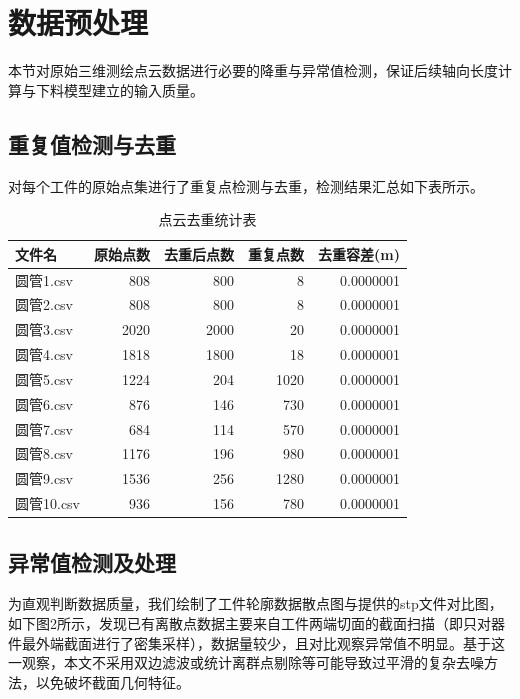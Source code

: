 \documentclass[UTF8]{ctexart}
\begin{document}
\section{数据预处理}
本节对原始三维测绘点云数据进行必要的降重与异常值检测，保证后续轴向长度计算与下料模型建立的输入质量。

\subsection{重复值检测与去重}

对每个工件的原始点集进行了重复点检测与去重，检测结果汇总如下表所示。
\begin{table}[htbp]
\centering
\caption{点云去重统计表}
\label{tab:dedup}
\begin{tabular}{l r r r r}
\toprule
文件名 & 原始点数 & 去重后点数 & 重复点数 & 去重容差(m) \\
\midrule
圆管1.csv  & 808  & 800  & 8    & 0.0000001 \\
圆管2.csv  & 808  & 800  & 8    & 0.0000001 \\
圆管3.csv  & 2020 & 2000 & 20   & 0.0000001 \\
圆管4.csv  & 1818 & 1800 & 18   & 0.0000001 \\
圆管5.csv  & 1224 & 204  & 1020 & 0.0000001 \\
圆管6.csv  & 876  & 146  & 730  & 0.0000001 \\
圆管7.csv  & 684  & 114  & 570  & 0.0000001 \\
圆管8.csv  & 1176 & 196  & 980  & 0.0000001 \\
圆管9.csv  & 1536 & 256  & 1280 & 0.0000001 \\
圆管10.csv & 936  & 156  & 780  & 0.0000001 \\
\bottomrule
\end{tabular}
\end{table}

\subsection{异常值检测及处理}

为直观判断数据质量，我们绘制了工件轮廓数据散点图与提供的stp文件对比图，如下图2所示，发现已有离散点数据主要来自工件两端切面的截面扫描（即只对器件最外端截面进行了密集采样），数据量较少，且对比观察异常值不明显。基于这一观察，本文不采用双边滤波或统计离群点剔除等可能导致过平滑的复杂去噪方法，以免破坏截面几何特征。
\end{document}

